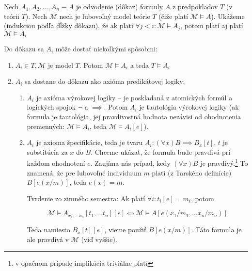 \begin{dokaz}
    Nech $A_1, A_2, \ldots, A_n\equiv A$ je odvodenie (dôkaz) formuly $A$
    z predpokladov $T$ (v teórii $T$).
    Nech $\mathcal{M}$ nech je ľubovoľný model teórie $T$ 
    (čiže platí $\mathcal{M} \models A$).
    Ukážeme (indukciou podľa dĺžky dôkazu), že 
    ak platí $\forall j<i:\mathcal{M} \models A_j$,
    potom platí aj platí $\mathcal{M} \models A_i$

    Do dôkazu sa $A_i$ môže dostať niekoľkými spôsobmi:
    \begin{enumerate}
    \item $A_i \in T, \mathcal{M}$ je model $T$. Potom 
        $\mathcal{M} \models A_i$ a teda $T \models A_i$

    \item $A_i$ sa dostane do dôkazu ako axióma predikátovej logiky:
    \begin{enumerate}
        \item $A_i$ je axióma výrokovej logiky -- je poskladaná z
            atomických formúl a logických spojok $\neg$ a $\implies$. Potom
            $A_i$ je tautológia výrokovej logiky (ak formula je tautológia,
            jej pravdivostná hodnota nezávisi od ohodnotenia
            premenných:
            $\mathcal{M} \models A_i$, teda $\mathcal{M} \models A_i[e]$).

        \item $A_i$ je axioma špecifikácie, teda je tvaru 
            $A_i: (\forall x) B \implies B_x[t]$, 
            $t$ je substitúcia za $x$ do $B$. 
            Chceme ukázať, že formula bude pravdivá
            pri každom ohodnotení $e$.
            Zaujíma nás prípad, kedy $(\forall x) B$ je pravdivý.\footnote{
                v opačnom prípade implikácia triviálne platí}
            To znamená, že pre ľubovoľné indivíduum $m$ platí (z Tarského
            definície) $B[e(x/m)]$, teda $e(x)=m$.
        
            Tvrdenie zo zimného semestra: Ak platí
              $\forall i: t_i[e] = m_i$, potom

            \begin{equation*}
                \mathcal{M} \models A_{x_1, \ldots x_n}[t_1, \ldots t_n][e] 
                    \iff
                \mathcal{M} \models A[e(x_1/m_1, \ldots x_n/m_n)]
            \end{equation*}

            Teda namiesto $B_x[t][e]$, vieme použiť $B[e(x/m)]$.
            Táto formula je ale pravdivá v $\mathcal{M}$ (viď vyššie).


\end{enumerate}
\end{enumerate}
\end{dokaz}
